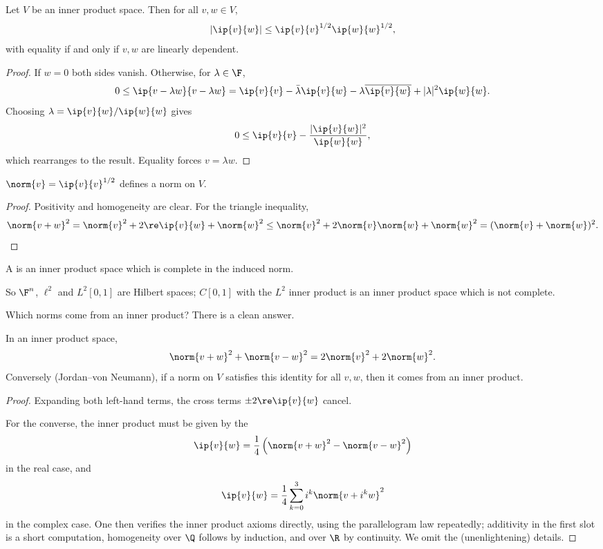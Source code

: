 \begin{proposition}
	Let $V$ be an inner product space. Then for all $v, w \in V$,
	$$|\ip{v}{w}| \leq \ip{v}{v}^{1/2}\ip{w}{w}^{1/2},$$
	with equality if and only if $v, w$ are linearly dependent.
\end{proposition}

\begin{proof}
	If $w = 0$ both sides vanish. Otherwise, for $\lambda \in \F$,
	$$0 \leq \ip{v - \lambda w}{v - \lambda w} = \ip{v}{v} - \bar\lambda\ip{v}{w} - \lambda \overline{\ip{v}{w}} + |\lambda|^2 \ip{w}{w}.$$
	Choosing $\lambda = \ip{v}{w}/\ip{w}{w}$ gives
	$$0 \leq \ip{v}{v} - \frac{|\ip{v}{w}|^2}{\ip{w}{w}},$$
	which rearranges to the result. Equality forces $v = \lambda w$.
\end{proof}

\begin{corollary}
	$\norm{v} = \ip{v}{v}^{1/2}$ defines a norm on $V$.
\end{corollary}

\begin{proof}
	Positivity and homogeneity are clear. For the triangle inequality,
	$$\norm{v+w}^2 = \norm{v}^2 + 2\re\ip{v}{w} + \norm{w}^2 \leq \norm{v}^2 + 2\norm{v}\norm{w} + \norm{w}^2 = (\norm{v}+\norm{w})^2. \qedhere$$
\end{proof}

\begin{definition}
	A  is an inner product space which is complete in the induced norm.
\end{definition}

So $\F^n$, $\ell^2$ and $L^2[0,1]$ are Hilbert spaces; $C[0,1]$ with the $L^2$ inner product is an inner product space which is not complete.

Which norms come from an inner product? There is a clean answer.

\begin{proposition}
	In an inner product space,
	$$\norm{v+w}^2 + \norm{v-w}^2 = 2\norm{v}^2 + 2\norm{w}^2.$$
	Conversely (Jordan--von Neumann), if a norm on $V$ satisfies this identity for all $v,w$, then it comes from an inner product.
\end{proposition}

\begin{proof}
	Expanding both left-hand terms, the cross terms $\pm 2\re\ip{v}{w}$ cancel.

	For the converse, the inner product must be given by the 
	$$\ip{v}{w} = \frac14\left( \norm{v+w}^2 - \norm{v-w}^2 \right)$$
	in the real case, and
	$$\ip{v}{w} = \frac14 \sum_{k=0}^{3} i^k \norm{v + i^k w}^2$$
	in the complex case. One then verifies the inner product axioms directly, using the parallelogram law repeatedly; additivity in the first slot is a short computation, homogeneity over $\Q$ follows by induction, and over $\R$ by continuity. We omit the (unenlightening) details.
\end{proof}

